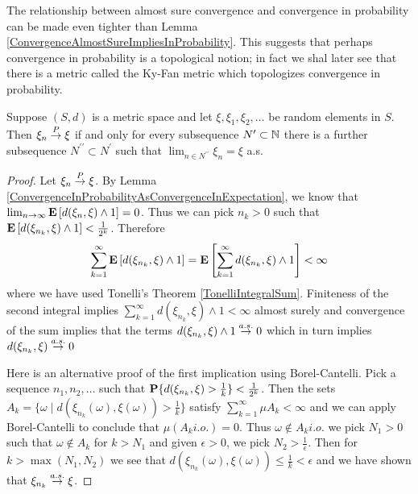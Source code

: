 The relationship between almost sure convergence and convergence in
probability can be made even tighter than Lemma \ref{ConvergenceAlmostSureImpliesInProbability}.  This suggests that perhaps convergence
in probability is a topological notion; in fact we shal later see that there is a metric called the Ky-Fan metric which topologizes convergence
in probability.
\begin{lem}\label{ConvergenceInProbabilityAlmostSureSubsequence}Suppose $(S,d)$ is a metric space and let $\xi,
  \xi_1, \xi_2, \dots$ be random elements in $S$.  Then $\xi_n \overset{P}\to
  \xi$ if and only for every subsequence $N^\prime \subset \mathbb{N}$ there is a
  further subsequence $N^{\prime\prime} \subset N^\prime$ such that
  $\lim_{n \in N^{\prime\prime}} \xi_n = \xi$ a.s.
\end{lem}
\begin{proof}
Let $\xi_n \overset{P}\to \xi$.  By Lemma
\ref{ConvergenceInProbabilityAsConvergenceInExpectation}, we know that
$\lim_{n \to \infty} \textbf{E}\left[d(\xi_n, \xi) \wedge 1\right]  = 0$.
Thus we can pick $n_k > 0$ such that $\textbf{E}\left[d(\xi_{n_k}, \xi)
  \wedge 1\right] < \frac{1}{2^k}$.  Therefore  
\begin{align*}\sum_{k=1}^\infty \textbf{E}\left[d(\xi_{n_k}, \xi)
  \wedge 1\right] = \textbf{E}\left[\sum_{k=1}^\infty   d(\xi_{n_k}, \xi)
  \wedge 1\right] < \infty
\end{align*} where we have used Tonelli's Theorem
\ref{TonelliIntegralSum}.  Finiteness of the second integral implies $\sum_{k=1}^\infty   d(\xi_{n_k}, \xi)
  \wedge 1 < \infty$ almost surely and convergence of the sum implies
  that the terms $d(\xi_{n_k}, \xi)  \wedge 1 \overset{a.s.}\to 0$ which in turn
  implies  $d(\xi_{n_k}, \xi)  \overset{a.s.}\to 0$

Here is an alternative proof of the first implication using Borel-Cantelli.  Pick a sequence $n_1,
n_2, \dots$ such that $\textbf{P}\{d(\xi_{n_k}, \xi) > \frac{1}{k}\} <
\frac{1}{2^k}$.  Then the sets $A_k=\{\omega \mid d(\xi_{n_k}(\omega),
\xi(\omega)) > \frac{1}{k} \}$ satisfy $\sum_{k=1}^\infty \mu A_k <
\infty$ and we can apply Borel-Cantelli to conclude that $\mu (A_k
i.o.) = 0$.  Thus $\omega \notin A_k
i.o. $ we pick $N_1 > 0$ such that $\omega \notin A_k$ for $k > N_1$
and given $\epsilon >0$, we pick $N_2 >
\frac{1}{\epsilon}$.  Then for $k > \max(N_1,N_2)$ we see that $d(\xi_{n_k}(\omega),
\xi(\omega)) \leq \frac{1}{k} < \epsilon$ and we have shown that $\xi_{n_k} \overset{a.s.}\to \xi$.


\end{proof}
